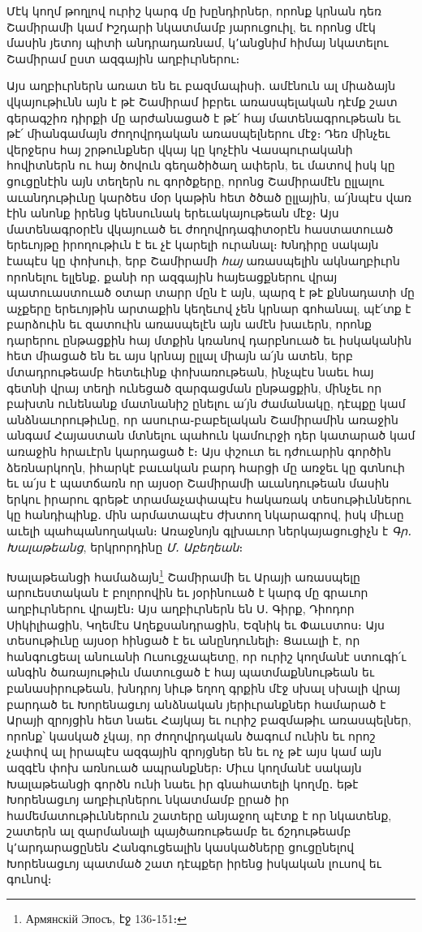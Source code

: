 \documentclass{article}
\begin{document}
{Մէկ կողմ թողլով ուրիշ կարգ մը խընդիրներ, որոնք կրնան դեռ Շամիրամի կամ Իշդարի նկատմամբ յարուցուիլ, եւ որոնց մէկ մասին յետոյ պիտի անդրադառնամ, կ՚անցնիմ հիմայ նկատելու Շամիրամ ըստ ազգային աղբիւրներու։

Այս աղբիւրներն առատ են եւ բազմապիսի․ ամէնուն ալ միաձայն վկայութիւնն այն է թէ Շամիրամ իբրեւ առասպելական դէմք շատ գերագշիռ դիրքի մը արժանացած է թէ՛ հայ մատենագրութեան եւ թէ՛ միանգամայն ժողովրդական առասպելներու մէջ։ Դեռ մինչեւ վերջերս հայ շրթունքներ վկայ կը կոչէին Վասպուրականի հովիտներն ու հայ ծովուն գեղածիծաղ ափերն, եւ մատով իսկ կը ցուցընէին այն տեղերն ու գործքերը, որոնց Շամիրամէն ըլլալու աւանդութիւնը կարծես մօր կաթին հետ ծծած ըլլային, ա՛յնպէս վառ էին անոնք իրենց կենսունակ երեւակայութեան մէջ։ Այս մատենագրօրէն վկայուած եւ ժողովրդագիտօրէն հաստատուած երեւոյթը իրողութիւն է եւ չէ կարելի ուրանալ։ Խնդիրը սակայն էապէս կը փոխուի, երբ Շամիրամի \emph{հայ} առասպելին ակնաղբիւրն որոնելու ելլենք․ քանի որ ազգային հայեացքներու վրայ պատուաստուած օտար տարր մըն է այն, պարզ է թէ քննադատի մը աչքերը երեւոյթին արտաքին կեղեւով չեն կրնար գոհանալ, պէ՛տք է բարձուին եւ զատուին առասպելէն այն ամէն խաւերն, որոնք դարերու ընթացքին հայ մտքին կռանով դարբնուած եւ իսկականին հետ միացած են եւ այս կրնայ ըլլալ միայն ա՛յն ատեն, երբ մտադրութեամբ հետեւինք փոխառութեան, ինչպէս նաեւ հայ գետնի վրայ տեղի ունեցած զարգացման ընթացքին, մինչեւ որ բախտն ունենանք մատնանիշ ընելու ա՛յն ժամանակը, դէպքը կամ անձնաւորութիւնը, որ ասուրա֊բաբելական Շամիրամին առաջին անգամ Հայաստան մտնելու պահուն կամուրջի դեր կատարած կամ առաջին հրաւէրն կարդացած է։ Այս փշուտ եւ դժուարին գործին ձեռնարկողն, իհարկէ բաւական բարդ հարցի մը առջեւ կը գտնուի եւ ա՛յս է պատճառն որ այսօր Շամիրամի աւանդութեան մասին երկու իրարու գրեթէ տրամաչափապէս հակառակ տեսութիւններու կը հանդիպինք․ մին արմատապէս ժխտող նկարագրով, իսկ միւսը աւելի պահպանողական։ Առաջնոյն գլխաւոր ներկայացուցիչն է \emph{Գր․ Խալաթեանց}, երկրորդինը \emph{Մ․ Աբեղեան}։

Խալաթեանցի համաձայն\footnote{Армянскій Эпосъ, էջ 136֊151։} Շամիրամի եւ Արայի առասպելը արուեստական է բոլորովին եւ յօրինուած է կարգ մը գրաւոր աղբիւրներու վրայէն։ Այս աղբիւրներն են Ս․ Գիրք, Դիոդոր Սիկիլիացին, Կղեմէս Աղեքսանդրացին, Եզնիկ եւ Փաւստոս։ Այս տեսութիւնը այսօր հինցած է եւ անընդունելի։ Ցաւալի է, որ հանգուցեալ անուանի Ուսուցչապետը, որ ուրիշ կողմանէ ստուգի՛ւ անգին ծառայութիւն մատուցած է հայ պատմաքննութեան եւ բանասիրութեան, խնդրոյ նիւթ եղող գրքին մէջ սխալ սխալի վրայ բարդած եւ Խորենացւոյ անձնական յերիւրանքներ համարած է Արայի զրոյցին հետ նաեւ Հայկայ եւ ուրիշ բազմաթիւ առասպելներ, որոնք՝ կասկած չկայ, որ ժողովրդական ծագում ունին եւ որոշ չափով ալ իրապէս ազգային զրոյցներ են եւ ոչ թէ այս կամ այն ազգէն փոխ առնուած ապրանքներ։ Միւս կողմանէ սակայն Խալաթեանցի գործն ունի նաեւ իր գնահատելի կողմը․ եթէ Խորենացւոյ աղբիւրներու նկատմամբ ըրած իր համեմատութիւններուն շատերը անյաջող պէտք է որ նկատենք, շատերն ալ զարմանալի պայծառութեամբ եւ ճշդութեամբ կ՚արդարացընեն Հանգուցեալին կասկածները ցուցընելով Խորենացւոյ պատմած շատ դէպքեր իրենց իսկական լուսով եւ գունով։

}
\end{document}
